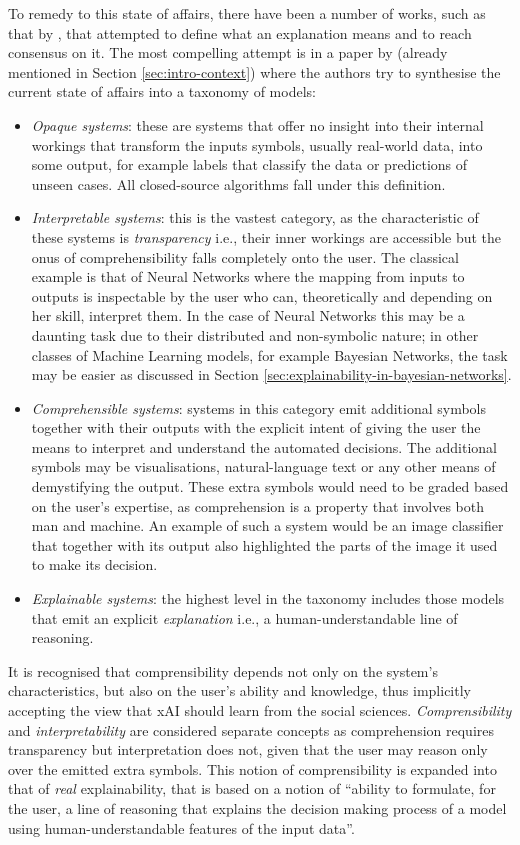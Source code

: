To remedy to this state of affairs, there have been a number of works, such as that by \citet{doshi2017towards}, that attempted to define what an explanation means and to reach consensus on it.
The most compelling attempt is in a paper by \citet{Doran2018} (already mentioned in Section \ref{sec:intro-context}) where the authors try to synthesise the current state of affairs into a taxonomy of models:
\begin{itemize}
	\item \textit{Opaque systems}: these are systems that offer no insight into their internal workings that transform the inputs symbols, usually real-world data, into some output, for example labels that classify the data or predictions of unseen cases. 
		All closed-source algorithms fall under this definition.
	\item \textit{Interpretable systems}: this is the vastest category, as the characteristic of these systems is \textit{transparency} i.e., their inner workings are accessible but the onus of comprehensibility falls completely onto the user.  
		The classical example is that of Neural Networks where the mapping from inputs to outputs is inspectable by the user who can, theoretically and depending on her skill, interpret them.
		In the case of Neural Networks this may be a daunting task due to their distributed and non-symbolic nature; in other classes of Machine Learning models, for example Bayesian Networks, the task may be easier as discussed in Section \ref{sec:explainability-in-bayesian-networks}.
	\item \textit{Comprehensible systems}: systems in this category emit additional symbols together with their outputs with the explicit intent of giving the user the means to interpret and understand the automated decisions.
		The additional symbols may be visualisations, natural-language text or any other means of demystifying the output.  
		These extra symbols would need to be graded based on the user's expertise, as comprehension is a property that involves both man and machine.
		An example of such a system would be an image classifier that together with its output also highlighted the parts of the image it used to make its decision.
	\item \textit{Explainable systems}: the highest level in the taxonomy includes those models that emit an explicit \textit{explanation} i.e., a human-understandable line of reasoning.
\end{itemize}
It is recognised that comprensibility depends not only on the system's characteristics, but also on the user's ability and knowledge, thus implicitly accepting the view that xAI should learn from the social sciences.
\textit{Comprensibility} and \textit{interpretability} are considered separate concepts as comprehension requires transparency but interpretation does not, given that the user may reason only over the emitted extra symbols.
This notion of comprensibility is expanded into that of \textit{real} explainability, that is based on a notion of \enquote{ability to formulate, for the user, a line of reasoning that explains the decision making process of a model using human-understandable features of the input data}.

